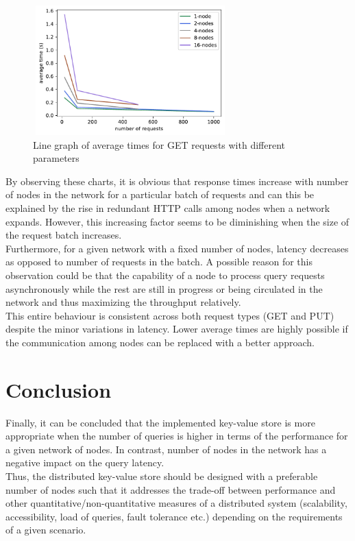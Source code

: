 \documentclass[
    a4paper,
    twocolumn,
]{article}
\begin{document}
\setlength{\intextsep}{5pt plus 2pt minus 0pt}
\begin{figure}[!ht]
	\centering
	\includegraphics[width=7.5cm, height=5cm]{get_line.pdf}
	\caption{Line graph of average times for GET requests with different parameters}
\end{figure}

By observing these charts, it is obvious that response times increase with number of nodes in the network for a particular batch of requests and can this be explained by the rise in redundant HTTP calls among nodes when a network expands. However, this increasing factor seems to be diminishing when the size of the request batch increases. \\

Furthermore, for a given network with a fixed number of nodes, latency decreases as opposed to number of requests in the batch. A possible reason for this observation could be that the capability of a node to process query requests asynchronously while the rest are still in progress or being circulated in the network and thus maximizing the throughput relatively.\\

This entire behaviour is consistent across both request types (GET and PUT) despite the minor variations in latency. Lower average times are highly possible if the communication among nodes can be replaced with a better approach.

\section{Conclusion}

Finally, it can be concluded that the implemented key-value store is more appropriate when the number of queries is higher in terms of the performance for a given network of nodes. In contrast, number of nodes in the network has a negative impact on the query latency. \\ 

Thus, the distributed key-value store should be designed with a preferable number of nodes such that it addresses the trade-off between performance and other quantitative/non-quantitative measures of a distributed system (scalability, accessibility, load of queries, fault tolerance etc.) depending on the requirements of a given scenario.
\end{document}
